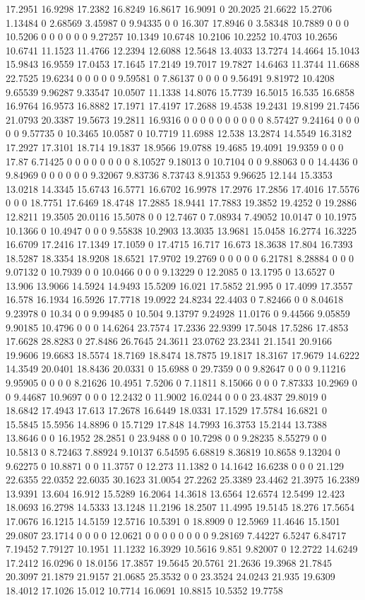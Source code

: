 17.2951 16.9298 17.2382 16.8249 16.8617 16.9091 0 20.2025 21.6622 15.2706 1.13484 0 2.68569 3.45987 0 9.94335 0 0 16.307 17.8946 0 3.58348 10.7889 0 0 0 10.5206 0 0 0 0 0 0 9.27257 10.1349 10.6748 10.2106 10.2252 10.4703 10.2656 10.6741 11.1523 11.4766 12.2394 12.6088 12.5648 13.4033 13.7274 14.4664 15.1043 15.9843 16.9559 17.0453 17.1645 17.2149 19.7017 19.7827 14.6463 11.3744 11.6688 22.7525 19.6234 0 0 0 0 0 9.59581 0 7.86137 0 0 0 0 9.56491 9.81972 10.4208 9.65539 9.96287 9.33547 10.0507 11.1338 14.8076 15.7739 16.5015 16.535 16.6858 16.9764 16.9573 16.8882 17.1971 17.4197 17.2688 19.4538 19.2431 19.8199 21.7456 21.0793 20.3387 19.5673 19.2811 16.9316 0 0 0 0 0 0 0 0 0 0 8.57427 9.24164 0 0 0 0 0 9.57735 0 10.3465 10.0587 0 10.7719 11.6988 12.538 13.2874 14.5549 16.3182 17.2927 17.3101 18.714 19.1837 18.9566 19.0788 19.4685 19.4091 19.9359 0 0 0 17.87 6.71425 0 0 0 0 0 0 0 0 8.10527 9.18013 0 10.7104 0 0 9.88063 0 0 14.4436 0 9.84969 0 0 0 0 0 0 9.32067 9.83736 8.73743 8.91353 9.96625 12.144 15.3353 13.0218 14.3345 15.6743 16.5771 16.6702 16.9978 17.2976 17.2856 17.4016 17.5576 0 0 0 18.7751 17.6469 18.4748 17.2885 18.9441 17.7883 19.3852 19.4252 0 19.2886 12.8211 19.3505 20.0116 15.5078 0 0 12.7467 0 7.08934 7.49052 10.0147 0 10.1975 10.1366 0 10.4947 0 0 0 9.55838 10.2903 13.3035 13.9681 15.0458 16.2774 16.3225 16.6709 17.2416 17.1349 17.1059 0 17.4715 16.717 16.673 18.3638 17.804 16.7393 18.5287 18.3354 18.9208 18.6521 17.9702 19.2769 0 0 0 0 0 6.21781 8.28884 0 0 0 9.07132 0 10.7939 0 0 10.0466 0 0 0 9.13229 0 12.2085 0 13.1795 0 13.6527 0 13.906 13.9066 14.5924 14.9493 15.5209 16.021 17.5852 21.995 0 17.4099 17.3557 16.578 16.1934 16.5926 17.7718 19.0922 24.8234 22.4403 0 7.82466 0 0 8.04618 9.23978 0 10.34 0 0 9.99485 0 10.504 9.13797 9.24928 11.0176 0 9.44566 9.05859 9.90185 10.4796 0 0 0 14.6264 23.7574 17.2336 22.9399 17.5048 17.5286 17.4853 17.6628 28.8283 0 27.8486 26.7645 24.3611 23.0762 23.2341 21.1541 20.9166 19.9606 19.6683 18.5574 18.7169 18.8474 18.7875 19.1817 18.3167 17.9679 14.6222 14.3549 20.0401 18.8436 20.0331 0 15.6988 0 29.7359 0 0 9.82647 0 0 0 9.11216 9.95905 0 0 0 0 8.21626 10.4951 7.5206 0 7.11811 8.15066 0 0 0 7.87333 10.2969 0 0 9.44687 10.9697 0 0 0 12.2432 0 11.9002 16.0244 0 0 0 23.4837 29.8019 0 18.6842 17.4943 17.613 17.2678 16.6449 18.0331 17.1529 17.5784 16.6821 0 15.5845 15.5956 14.8896 0 15.7129 17.848 14.7993 16.3753 15.2144 13.7388 13.8646 0 0 16.1952 28.2851 0 23.9488 0 0 10.7298 0 0 9.28235 8.55279 0 0 10.5813 0 8.72463 7.88924 9.10137 6.54595 6.68819 8.36819 10.8658 9.13204 0 9.62275 0 10.8871 0 0 11.3757 0 12.273 11.1382 0 14.1642 16.6238 0 0 0 21.129 22.6355 22.0352 22.6035 30.1623 31.0054 27.2262 25.3389 23.4462 21.3975 16.2389 13.9391 13.604 16.912 15.5289 16.2064 14.3618 13.6564 12.6574 12.5499 12.423 18.0693 16.2798 14.5333 13.1248 11.2196 18.2507 11.4995 19.5145 18.276 17.5654 17.0676 16.1215 14.5159 12.5716 10.5391 0 18.8909 0 12.5969 11.4646 15.1501 29.0807 23.1714 0 0 0 0 12.0621 0 0 0 0 0 0 0 0 9.28169 7.44227 6.5247 6.84717 7.19452 7.79127 10.1951 11.1232 16.3929 10.5616 9.851 9.82007 0 12.2722 14.6249 17.2412 16.0296 0 18.0156 17.3857 19.5645 20.5761 21.2636 19.3968 21.7845 20.3097 21.1879 21.9157 21.0685 25.3532 0 0 23.3524 24.0243 21.935 19.6309 18.4012 17.1026 15.012 10.7714 16.0691 10.8815 10.5352 19.7758 